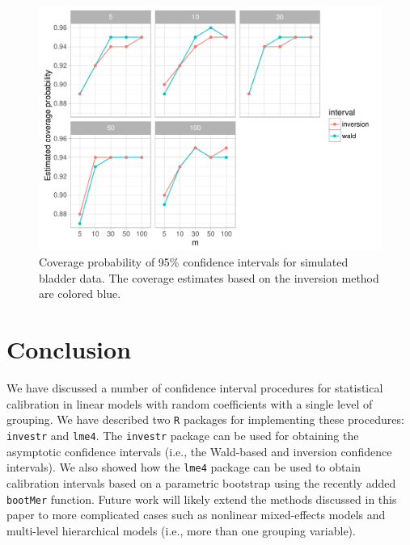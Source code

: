 \documentclass{article}\usepackage[]{graphicx}\usepackage[]{color}
\makeatletter
\def\maxwidth{ %
  \ifdim\Gin@nat@width>\linewidth
    \linewidth
  \else
    \Gin@nat@width
  \fi
}
\newenvironment{knitrout}{}{} %
\makeatother
\begin{document}
\begin{knitrout}
\color{fgcolor}\begin{figure}[!htb]
\includegraphics[width=\maxwidth]{figure/simulation-1} \caption[Coverage probability of 95\% confidence intervals for simulated bladder data]{Coverage probability of 95\% confidence intervals for simulated bladder data. The coverage estimates based on the inversion method are colored blue.}\label{fig:simulation}
\end{figure}


\end{knitrout}


\section{Conclusion}

We have discussed a number of confidence interval procedures for statistical calibration in linear models with random coefficients with a single level of grouping.  We have described two \texttt{R} packages for implementing these procedures: \texttt{investr} and \texttt{lme4}.  The \texttt{investr} package can be used for obtaining the asymptotic confidence intervals (i.e., the Wald-based and inversion confidence intervals).  We also showed how the \texttt{lme4} package can be used to obtain calibration intervals based on a parametric bootstrap using the recently added \texttt{bootMer} function.  Future work will likely extend the methods discussed in this paper to more complicated cases such as nonlinear mixed-effects models and multi-level hierarchical models (i.e., more than one grouping variable).
\end{document}
